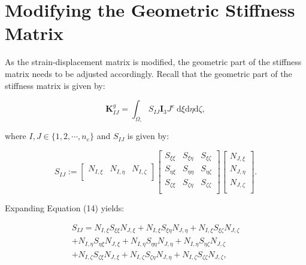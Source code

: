 \documentclass[12pt]{article}
\begin{document}
\section{Modifying the Geometric Stiffness Matrix}

As the strain-displacement matrix is modified, the geometric part of the stiffness matrix needs to be adjusted accordingly. Recall that the geometric part of the stiffness matrix is given by:

\begin{equation}
\boldsymbol{K}^g_{IJ} = \int_{\Omega_\square} S_{IJ} \boldsymbol{I}_3 J^e \ \mathrm{d}\xi \mathrm{d}\eta \mathrm{d}\zeta,
\end{equation}

\noindent
where $I,J \in \{1, 2, \cdots, n_e \}$ and $S_{IJ}$ is given by:

\begin{equation}
S_{IJ} := \begin{bmatrix}
N_{I,\xi} & N_{I,\eta} & N_{I,\zeta}  \\
\end{bmatrix}
\begin{bmatrix}
S_{\xi\xi} & S_{\xi\eta} & S_{\xi\zeta}  \\
S_{\eta\xi} & S_{\eta\eta} & S_{\eta\zeta}  \\
S_{\zeta\xi} & S_{\zeta\eta} & S_{\zeta\zeta}  \\
\end{bmatrix}
\begin{bmatrix}
N_{J,\xi}  \\
N_{J,\eta}  \\
N_{J,\zeta}  \\
\end{bmatrix}.
\end{equation}

Expanding Equation (14) yields:

\begin{equation}
\begin{split}
S_{IJ} = N_{I,\xi} S_{\xi \xi} N_{J,\xi} + N_{I,\xi} S_{\xi \eta} N_{J,\eta} + N_{I,\xi} S_{\xi \zeta} N_{J,\zeta} \\ + N_{I,\eta} S_{\eta \xi} N_{J,\xi} + N_{I,\eta} S_{\eta \eta} N_{J,\eta} + N_{I,\eta} S_{\eta \zeta} N_{J,\zeta} \\ + N_{I,\zeta} S_{\zeta \xi} N_{J,\xi} + N_{I,\zeta} S_{\zeta \eta} N_{J,\eta} + N_{I,\zeta} S_{\zeta \zeta} N_{J,\zeta},
\end{split}
\end{equation}
\end{document}

